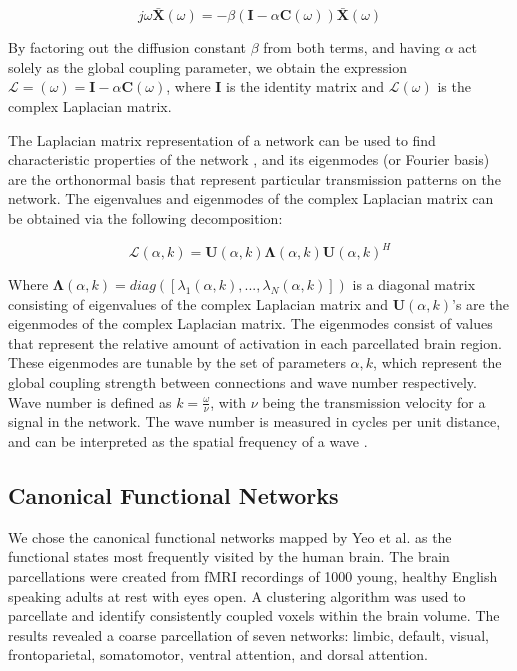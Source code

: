 \documentclass{article}
\begin{document}
\begin{equation}
\label{eq3}
j\omega \pmb{\bar{X}}(\omega) = -\beta (\pmb{I} - \alpha \pmb{C}(\omega)) \pmb{\bar{X}}(\omega)
\end{equation}

By factoring out the diffusion constant $\beta$ from both terms, and having $\alpha$ act solely as the global coupling parameter, we obtain the expression $\mathcal{L} = (\omega) = \pmb{I} - \alpha \pmb{C}(\omega)$, where $\pmb{I}$ is the identity matrix and $\mathcal{L}(\omega)$ is the complex Laplacian matrix.

The Laplacian matrix representation of a network can be used to find characteristic properties of the network \cite{Stewart1999}, and its eigenmodes (or Fourier basis) are the orthonormal basis that represent particular transmission patterns on the network. The eigenvalues and eigenmodes of the complex Laplacian matrix can be obtained via the following decomposition:

\begin{equation}
\label{eq4}
\bm{\mathcal{L}}(\alpha, k) = \bm{U}(\alpha, k)\bm{\Lambda}(\alpha, k)\bm{U}(\alpha, k)^{H}
\end{equation}

Where $\bm{\Lambda}(\alpha, k) = diag([\lambda_{1}(\alpha, k), ... , \lambda_{N}(\alpha, k)])$ is a diagonal matrix consisting of eigenvalues of the complex Laplacian matrix and $\bm{U}(\alpha, k)$'s are the eigenmodes of the complex Laplacian matrix. The eigenmodes consist of values that represent the relative amount of activation in each parcellated brain region. These eigenmodes are tunable by the set of parameters ${\alpha, k}$, which represent the global coupling strength between connections and wave number respectively. Wave number is defined as $k = \frac{\omega}{\nu}$, with $\nu$ being the transmission velocity for a signal in the network. The wave number is measured in cycles per unit distance, and can be interpreted as the spatial frequency of a wave \cite{French1971}. 

\subsection{Canonical Functional Networks}
We chose the canonical functional networks mapped by Yeo et al. \cite{Yeo2011} as the functional states most frequently visited by the human brain. The brain parcellations were created from fMRI recordings of 1000 young, healthy English speaking adults at rest with eyes open. A clustering algorithm was used to parcellate and identify consistently coupled voxels within the brain volume. The results revealed a coarse parcellation of seven networks: limbic, default, visual, frontoparietal, somatomotor, ventral attention, and dorsal attention. 
\end{document}
